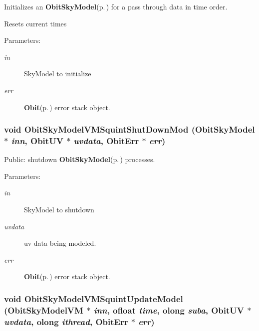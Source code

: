 Initializes an {\bf Obit\-Sky\-Model}{\rm (p.\,\pageref{structObitSkyModel})} for a pass through data in time order. 

Resets current times \begin{Desc}
\item[Parameters:]
\begin{description}
\item[{\em in}]Sky\-Model to initialize \item[{\em err}]{\bf Obit}{\rm (p.\,\pageref{structObit})} error stack object. \end{description}
\end{Desc}
\subsubsection{\setlength{\rightskip}{0pt plus 5cm}void Obit\-Sky\-Model\-VMSquint\-Shut\-Down\-Mod ({\bf Obit\-Sky\-Model} $\ast$ {\em inn}, {\bf Obit\-UV} $\ast$ {\em uvdata}, {\bf Obit\-Err} $\ast$ {\em err})}\label{ObitSkyModelVMSquint_8c_a20}


Public: shutdown {\bf Obit\-Sky\-Model}{\rm (p.\,\pageref{structObitSkyModel})} processes. 

\begin{Desc}
\item[Parameters:]
\begin{description}
\item[{\em in}]Sky\-Model to shutdown \item[{\em uvdata}]uv data being modeled. \item[{\em err}]{\bf Obit}{\rm (p.\,\pageref{structObit})} error stack object. \end{description}
\end{Desc}
\subsubsection{\setlength{\rightskip}{0pt plus 5cm}void Obit\-Sky\-Model\-VMSquint\-Update\-Model ({\bf Obit\-Sky\-Model\-VM} $\ast$ {\em inn}, {\bf ofloat} {\em time}, {\bf olong} {\em suba}, {\bf Obit\-UV} $\ast$ {\em uvdata}, {\bf olong} {\em ithread}, {\bf Obit\-Err} $\ast$ {\em err})}\label{ObitSkyModelVMSquint_8c_a22}


